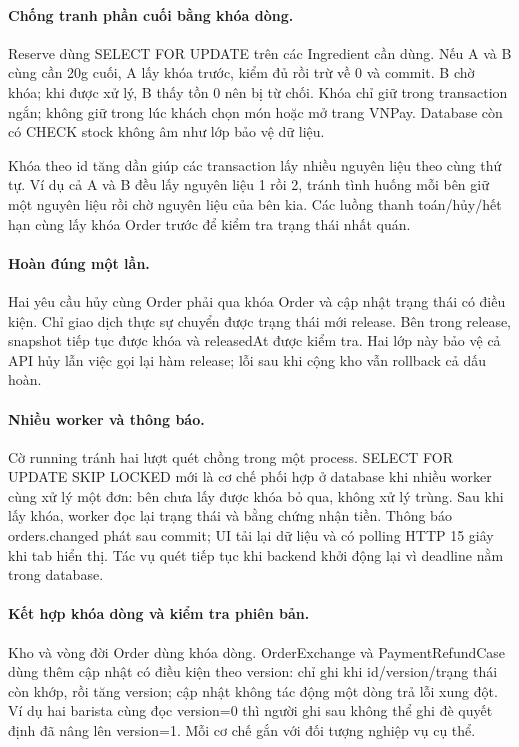 \paragraph{Chống tranh phần cuối bằng khóa dòng.}
Reserve dùng SELECT FOR UPDATE trên các Ingredient cần dùng. Nếu A và B cùng cần 20g cuối, A lấy khóa trước, kiểm đủ rồi trừ về 0 và commit. B chờ khóa; khi được xử lý, B thấy tồn 0 nên bị từ chối. Khóa chỉ giữ trong transaction ngắn; không giữ trong lúc khách chọn món hoặc mở trang VNPay. Database còn có CHECK stock không âm như lớp bảo vệ dữ liệu.

Khóa theo id tăng dần giúp các transaction lấy nhiều nguyên liệu theo cùng thứ tự. Ví dụ cả A và B đều lấy nguyên liệu 1 rồi 2, tránh tình huống mỗi bên giữ một nguyên liệu rồi chờ nguyên liệu của bên kia. Các luồng thanh toán/hủy/hết hạn cùng lấy khóa Order trước để kiểm tra trạng thái nhất quán.

\paragraph{Hoàn đúng một lần.}
Hai yêu cầu hủy cùng Order phải qua khóa Order và cập nhật trạng thái có điều kiện. Chỉ giao dịch thực sự chuyển được trạng thái mới release. Bên trong release, snapshot tiếp tục được khóa và releasedAt được kiểm tra. Hai lớp này bảo vệ cả API hủy lẫn việc gọi lại hàm release; lỗi sau khi cộng kho vẫn rollback cả dấu hoàn.

\paragraph{Nhiều worker và thông báo.}
Cờ running tránh hai lượt quét chồng trong một process. SELECT FOR UPDATE SKIP LOCKED mới là cơ chế phối hợp ở database khi nhiều worker cùng xử lý một đơn: bên chưa lấy được khóa bỏ qua, không xử lý trùng. Sau khi lấy khóa, worker đọc lại trạng thái và bằng chứng nhận tiền. Thông báo orders.changed phát sau commit; UI tải lại dữ liệu và có polling HTTP 15 giây khi tab hiển thị. Tác vụ quét tiếp tục khi backend khởi động lại vì deadline nằm trong database.

\paragraph{Kết hợp khóa dòng và kiểm tra phiên bản.}
Kho và vòng đời Order dùng khóa dòng. OrderExchange và PaymentRefundCase dùng thêm cập nhật có điều kiện theo version: chỉ ghi khi id/version/trạng thái còn khớp, rồi tăng version; cập nhật không tác động một dòng trả lỗi xung đột. Ví dụ hai barista cùng đọc version=0 thì người ghi sau không thể ghi đè quyết định đã nâng lên version=1. Mỗi cơ chế gắn với đối tượng nghiệp vụ cụ thể.

